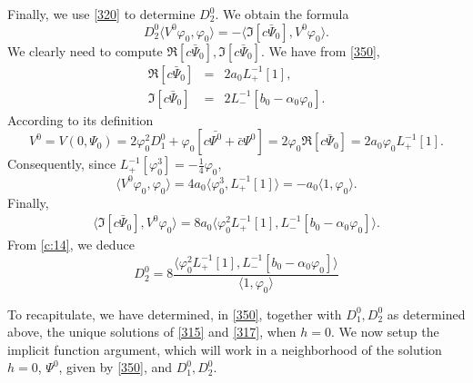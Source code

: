 \documentclass[12pt]{amsart}
\theoremstyle{definition}
\theoremstyle{remark}
\numberwithin{equation}{section}
\renewcommand{\(}{\left(}
\renewcommand{\)}{\right)}
\renewcommand{\[}{\left[}
\renewcommand{\]}{\right]}
\newcommand{\f}[2]{\frac{#1}{#2}}
\newcommand{\al}{\alpha}
\newcommand{\vp}{\varphi}
\newcommand{\dpr}[2]{\langle #1,#2 \rangle}
\begin{document}
  Finally, we use \eqref{320} to determine $D_2^0$. We obtain the formula
 \begin{equation}
 \label{c:14}
 D_2^0\dpr{V^0 \vp_0}{\vp_0}=-\dpr{\Im[c\bar{\Psi}_0]}{V^0 \vp_0}.
 \end{equation}
  We clearly need to compute $\Re[c\bar{\Psi}_0], \Im[c\bar{\Psi}_0]$. We have from \eqref{350},
  \begin{eqnarray*}
\Re[c\bar{\Psi}_0] &=&    2 a_0  L_+^{-1}[1],      \\
\Im[c\bar{\Psi}_0]&=&  2 L_-^{-1}[b_0-\al_0 \vp_0].
  \end{eqnarray*}
  According to its definition
  $$
  V^0=V(0, \Psi_0)=2  \vp_0^2 D_1^0+\vp_0[c \bar{\Psi^0}+\bar{c}\Psi^0]=2\vp_0\Re[c\bar{\Psi}_0]=
  2 a_0  \vp_0 L_+^{-1}[1].
  $$
  Consequently, since $L_+^{-1}[\vp_0^3]=-\f{1}{4} \vp_0$,
   \begin{equation}
   \label{c:27}
   	 \dpr{V^0 \vp_0}{\vp_0} = 4 a_0  \dpr{\vp_0^3}{L_+^{-1}[1]}= - a_0  \dpr{1}{\vp_0}.
   \end{equation}
   Finally,
     \begin{eqnarray*}
   \dpr{\Im[c\bar{\Psi}_0]}{V^0 \vp_0} = 8 a_0 \dpr{\vp_0^2 L_+^{-1}[1]}{L_-^{-1}[b_0-\al_0 \vp_0]}.
      \end{eqnarray*}
      From \eqref{c:14}, we deduce
      \begin{equation}
      \label{c:17}
       D_2^0=  8 \f{\dpr{\vp_0^2 L_+^{-1}[1]}{L_-^{-1}[b_0-\al_0 \vp_0]}}{\dpr{1}{\vp_0}}
      \end{equation}



 To recapitulate, we have determined, in  \eqref{350}, together with $D_1^0, D_2^0$ as determined above,
 the unique solutions of \eqref{315} and \eqref{317}, when $h=0$.
 We now setup the implicit function argument, which will work in a neighborhood of the solution $h=0$, $\Psi^0$, given by \eqref{350}, and $ D_1^0, D_2^0$.
\end{document}

